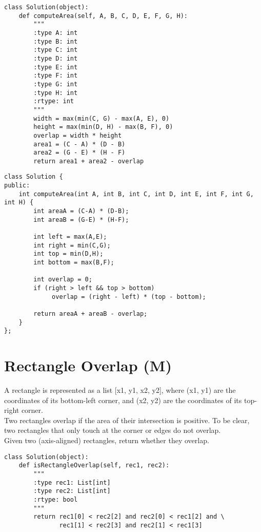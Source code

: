 \begin{lstlisting}
class Solution(object):
    def computeArea(self, A, B, C, D, E, F, G, H):
        """
        :type A: int
        :type B: int
        :type C: int
        :type D: int
        :type E: int
        :type F: int
        :type G: int
        :type H: int
        :rtype: int
        """
        width = max(min(C, G) - max(A, E), 0)
        height = max(min(D, H) - max(B, F), 0)
        overlap = width * height
        area1 = (C - A) * (D - B)
        area2 = (G - E) * (H - F)
        return area1 + area2 - overlap
\end{lstlisting}

\begin{lstlisting}
class Solution {
public:
    int computeArea(int A, int B, int C, int D, int E, int F, int G, int H) {
        int areaA = (C-A) * (D-B);
        int areaB = (G-E) * (H-F);
        
        int left = max(A,E);
        int right = min(C,G);
        int top = min(D,H);
        int bottom = max(B,F);
        
        int overlap = 0;
        if (right > left && top > bottom)
             overlap = (right - left) * (top - bottom);
             
        return areaA + areaB - overlap;
    }
};
\end{lstlisting}

\section{Rectangle Overlap (M)}
A rectangle is represented as a list [x1, y1, x2, y2], where (x1, y1) are the coordinates of its bottom-left corner, and (x2, y2) are the coordinates of its top-right corner.\\

Two rectangles overlap if the area of their intersection is positive.  To be clear, two rectangles that only touch at the corner or edges do not overlap.\\

Given two (axis-aligned) rectangles, return whether they overlap.\\
\begin{lstlisting}
class Solution(object):
    def isRectangleOverlap(self, rec1, rec2):
        """
        :type rec1: List[int]
        :type rec2: List[int]
        :rtype: bool
        """
        return rec1[0] < rec2[2] and rec2[0] < rec1[2] and \
               rec1[1] < rec2[3] and rec2[1] < rec1[3]
\end{lstlisting}


